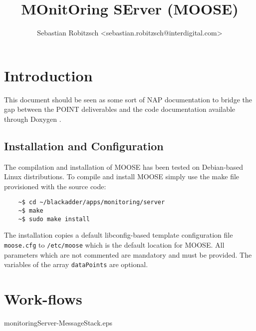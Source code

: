 \documentclass[a4paper,11pt,titlepage]{report}
\title{\textbf{MOnitOring SErver (MOOSE)}}
\author{Sebastian Robitzsch <sebastian.robitzsch@interdigital.com>}
\begin{document}
\setcounter{secnumdepth}{3} %
\lstset{language=C++}   
\maketitle
\tableofcontents
\newpage

\acresetall
\chapter{Introduction}\label{ch:Introduction}
This document should be seen as some sort of \ac{NAP} documentation to bridge the gap between the POINT deliverables and the code documentation available through Doxygen \cite{Heesch}. 
\section{Installation and Configuration}
The compilation and installation of \ac{MOOSE} has been tested on Debian-based Linux distributions. To compile and install \ac{MOOSE} simply use the make file provisioned with the source code:

\begin{lstlisting}
	~$ cd ~/blackadder/apps/monitoring/server
	~$ make
	~$ sudo make install
\end{lstlisting}

The installation copies a default libconfig-based template configuration file \texttt{moose.cfg} to \texttt{/etc/moose} which is the default location for \ac{MOOSE}. All parameters which are not commented are mandatory and must be provided. The variables of the array \texttt{dataPoints} are optional.


\chapter{Work-flows}
monitoringServer-MessageStack.eps
\end{document}
